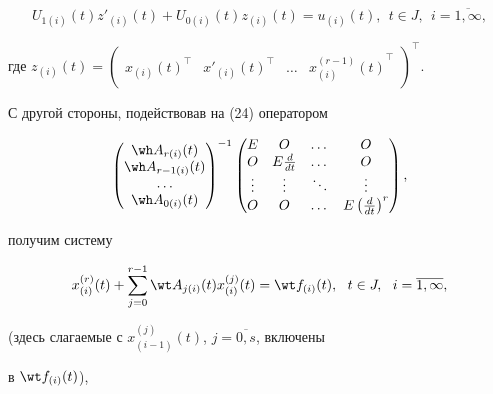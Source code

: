 \begin{pf}
\begin{equation}
U_{1(i)}(t)z'_{(i)}(t)+U_{0(i)}(t)z_{(i)}(t)=u_{(i)}(t), \ \


t \in J, \ \ i=\overline{1,\infty},


\end{equation}


где $z_{(i)}(t)=


\begin{pmatrix}


{x_{(i)}(t)}^\top & {x'_{(i)}(t)}^\top


& \dotsc & {x^{(r-1)}_{(i)}(t)}^\top 


\end{pmatrix}^\top$.





С другой стороны, подействовав на (24) оператором


$$


\begin{pmatrix}


\wh A_{r(i)}(t) \\ \wh A_{r-1(i)}(t) \\ \dotsc \\ \wh A_{0(i)}(t)


\end{pmatrix}^{-1}


\begin{pmatrix}


E & O & \dotsc & O\\


O & E\frac{d}{dt} & \dotsc & O\\


\vdots & \vdots & \ddots & \vdots\\


O & O & \dotsc & E\left( \frac{d}{dt}\right)^r 


\end{pmatrix},


$$


получим систему


\begin{equation}


x_{(i)}^{(r)}(t) + \sum_{j=0}^{r-1}{ \wt A_{j(i)}(t)


x_{(i)}^{(j)}(t)}=\wt f_{(i)}(t), \ \ t \in J, \ \ i=\overline{1,\infty},


\end{equation}


(здесь слагаемые с $x_{(i-1)}^{(j)}(t)$, $j=\overline{0,s}$, включены


в $\wt f_{(i)}(t)$),



\end{pf}
